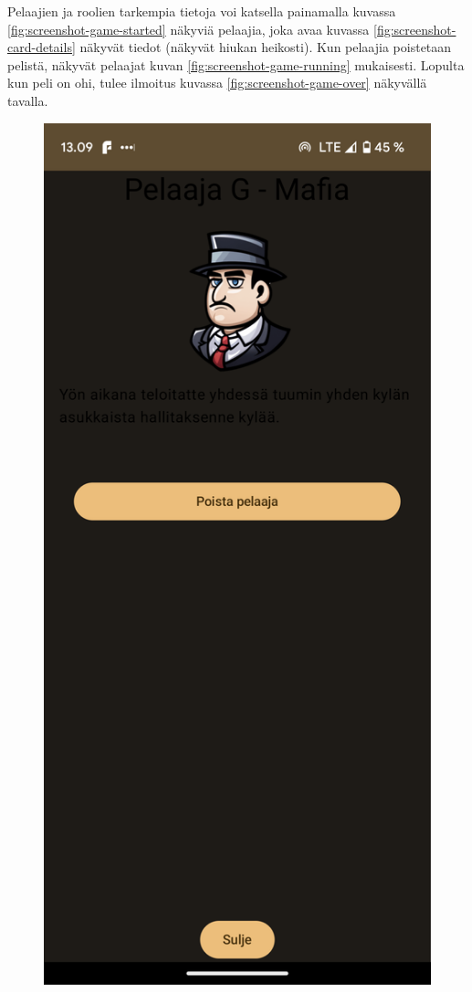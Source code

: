 Pelaajien ja roolien tarkempia tietoja voi katsella painamalla kuvassa
\ref{fig:screenshot-game-started} näkyviä pelaajia, joka avaa kuvassa
\ref{fig:screenshot-card-details} näkyvät tiedot (näkyvät hiukan heikosti). Kun
pelaajia poistetaan pelistä, näkyvät pelaajat kuvan
\ref{fig:screenshot-game-running} mukaisesti. Lopulta kun peli on ohi, tulee
ilmoitus kuvassa \ref{fig:screenshot-game-over} näkyvällä tavalla.

\begin{figure}[h!]
      \centering
      \begin{minipage}[t]{.3\textwidth}
            \includegraphics[width=\textwidth]{figures/screenshot-card-details.png}

\end{minipage}
\end{figure}
